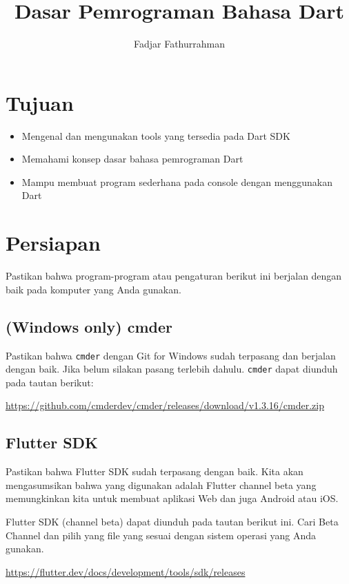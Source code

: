\documentclass[a4paper,11pt]{article} %
\newcommand{\txtinline}[1]{\texttt{#1}}
\begin{document}
\title{Dasar Pemrograman Bahasa Dart}
\author{Fadjar Fathurrahman}
\date{}
\maketitle

\section{Tujuan}

\begin{itemize}
\item Mengenal dan mengunakan tools yang tersedia pada Dart SDK
\item Memahami konsep dasar bahasa pemrograman Dart
\item Mampu membuat program sederhana pada console dengan menggunakan Dart
\end{itemize}

\section{Persiapan}

Pastikan bahwa program-program atau pengaturan berikut ini berjalan
dengan baik pada komputer yang Anda gunakan.

\subsection{(Windows only) cmder}
Pastikan bahwa \txtinline{cmder} dengan Git for Windows sudah terpasang
dan berjalan dengan baik. Jika belum silakan pasang terlebih dahulu.
\txtinline{cmder} dapat diunduh pada tautan berikut:

{\footnotesize
\url{https://github.com/cmderdev/cmder/releases/download/v1.3.16/cmder.zip}
}

\subsection{Flutter SDK}

Pastikan bahwa Flutter SDK sudah terpasang dengan baik. Kita akan mengasumsikan
bahwa yang digunakan adalah Flutter channel beta yang memungkinkan kita untuk
membuat aplikasi Web dan juga Android atau iOS.

Flutter SDK (channel beta) dapat diunduh pada tautan berikut ini.
Cari Beta Channel dan pilih yang file yang sesuai dengan sistem operasi
yang Anda gunakan.

{\footnotesize
\url{https://flutter.dev/docs/development/tools/sdk/releases}
}
\end{document}
